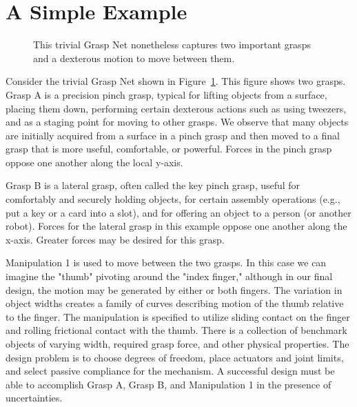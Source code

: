 \section{A Simple Example}


\begin{figure}
\begin{center}
\vspace*{2in}
\end{center}
\caption[]{This trivial Grasp Net nonetheless captures two important grasps and a dexterous motion to move between them.}
\label{SimpleGraspNet}
\end{figure}

Consider the trivial Grasp Net shown in Figure~\ref{SimpleGraspNet}.     This figure shows two grasps.   Grasp A is a precision pinch grasp, typical for lifting objects from a surface, placing them down, performing certain dexterous actions such as using tweezers, and as a staging point for moving to other grasps.   We observe that many objects are initially acquired from a surface in a pinch grasp and then moved to a final grasp that is more useful, comfortable, or powerful.    Forces in the pinch grasp oppose one another along the local y-axis.   

Grasp B is a lateral grasp, often called the key pinch grasp, useful for comfortably and securely holding objects, for certain assembly operations (e.g., put a key or a card into a slot), and for offering an object to a person (or another robot).   Forces for the lateral grasp in this example oppose one another along the x-axis.  Greater forces may be desired for this grasp.   

Manipulation 1 is used to move between the two grasps.   In this case we can imagine the "thumb" pivoting around the "index finger," although in our final design, the motion may be generated by either or both fingers.    The variation in object widths creates a family of curves describing motion of the thumb relative to the finger.   The manipulation is specified to utilize sliding contact on the finger and rolling frictional contact with the thumb.  There is a collection of benchmark objects of varying width, required grasp force, and other physical properties.   The design problem is to choose degrees of freedom, place actuators and joint limits, and select passive compliance for the mechanism.  A successful design must be able to accomplish Grasp A, Grasp B, and Manipulation 1 in the presence of uncertainties.

